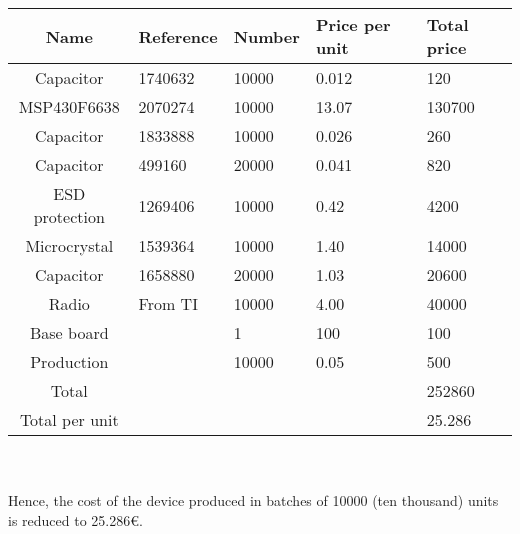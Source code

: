 \begin{tabular}{| c |l | l | l | l |} 
		\hline
		Name & Reference & Number & Price per unit & Total price\\ \hline
	 	Capacitor & 1740632 & 10000 & 0.012  & 120\\ \hline
	 	MSP430F6638 & 2070274 & 10000 & 13.07 & 130700\\ \hline
	 	Capacitor & 1833888 & 10000 & 0.026  & 260\\ \hline
	 	Capacitor & 499160 & 20000 & 0.041  & 820\\ \hline
	 	ESD protection & 1269406 & 10000 & 0.42  & 4200\\ \hline
	 	Microcrystal & 1539364 & 10000 & 1.40 & 14000\\ \hline
	 	Capacitor & 1658880 & 20000 & 1.03  & 20600\\ \hline
	 	Radio & From TI & 10000 & 4.00 & 40000\\ \hline
		Base board &  & 1 & 100 & 100\\ \hline
		Production &  & 10000 & 0.05 & 500\\ \hline
	 	Total &  &  &  & 252860\\ \hline
	 	Total per unit &  &  &  & 25.286\\
	\hline
\end{tabular}\\\\

	Hence, the cost of the device produced in batches of 10000 (ten thousand) units is reduced to 25.286{\small \euro}.